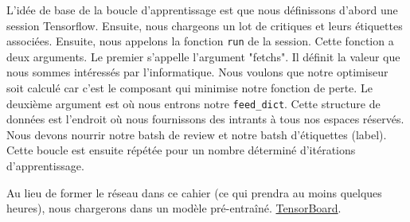 \documentclass[11pt]{article}
\begin{document}
    L'idée de base de la boucle d'apprentissage est que nous définissons
d'abord une session Tensorflow. Ensuite, nous chargeons un lot de
critiques et leurs étiquettes associées. Ensuite, nous appelons la
fonction \texttt{run} de la session. Cette fonction a deux arguments. Le
premier s'appelle l'argument "fetchs". Il définit la valeur que nous
sommes intéressés par l'informatique. Nous voulons que notre optimiseur
soit calculé car c'est le composant qui minimise notre fonction de
perte. Le deuxième argument est où nous entrons notre
\texttt{feed\_dict}. Cette structure de données est l'endroit où nous
fournissons des intrants à tous nos espaces réservés. Nous devons
nourrir notre batsh de review et notre batsh d'étiquettes (label). Cette
boucle est ensuite répétée pour un nombre déterminé d'itérations
d'apprentissage.

    Au lieu de former le réseau dans ce cahier (ce qui prendra au moins
quelques heures), nous chargerons dans un modèle pré-entraîné.
\href{https://www.tensorflow.org/get_started/summaries_and_tensorboard}{TensorBoard}.
\end{document}
